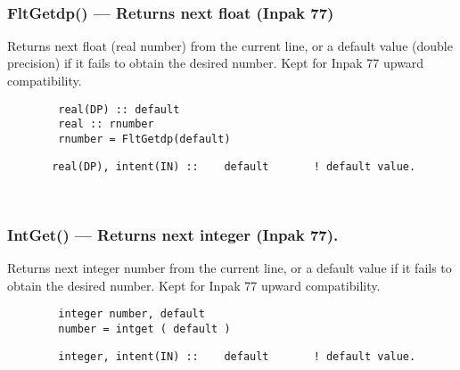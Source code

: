  
\mbox{}\hrulefill\ 
 
  \subsubsection{FltGetdp() --- Returns next float (Inpak 77) }

    Returns next float (real number) from the current line, or a 
    default value (double precision) if it fails to obtain the desired 
    number.  Kept for Inpak 77 upward compatibility.
  
\begin{verbatim}        real(DP) :: default
        real :: rnumber 
        rnumber = FltGetdp(default)\end{verbatim}
\begin{verbatim}       real(DP), intent(IN) ::    default       ! default value.
 \end{verbatim}%
 
 
\mbox{}\hrulefill\ 

  \subsubsection{IntGet() --- Returns next integer (Inpak 77).  }

    Returns next integer number from the current line, or a default 
    value if it fails to obtain the desired number.
    Kept for Inpak 77 upward compatibility.
  
\begin{verbatim}        integer number, default
        number = intget ( default )\end{verbatim}
\begin{verbatim}        integer, intent(IN) ::    default       ! default value.
 \end{verbatim}%
 
